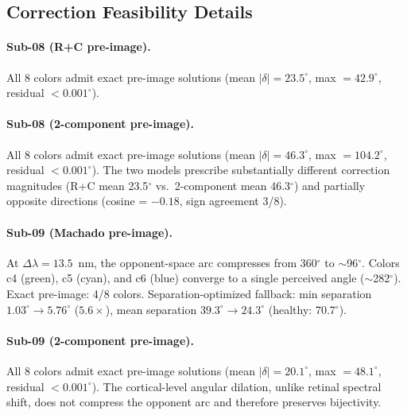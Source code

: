 \documentclass{article}
\begin{document}
\subsection{Correction Feasibility Details}

\paragraph{Sub-08 (R+C pre-image).}
All 8 colors admit exact pre-image solutions (mean $|\delta| = 23.5^\circ$, max $= 42.9^\circ$, residual $< 0.001^\circ$).

\paragraph{Sub-08 (2-component pre-image).}
All 8 colors admit exact pre-image solutions (mean $|\delta| = 46.3^\circ$, max $= 104.2^\circ$, residual $< 0.001^\circ$).
The two models prescribe substantially different correction magnitudes (R+C mean 23.5$^\circ$ vs.\ 2-component mean 46.3$^\circ$) and partially opposite directions (cosine = $-0.18$, sign agreement 3/8).

\paragraph{Sub-09 (Machado pre-image).}
At $\Delta\lambda = 13.5$~nm, the opponent-space arc compresses from 360$^\circ$ to $\sim$96$^\circ$.
Colors c4 (green), c5 (cyan), and c6 (blue) converge to a single perceived angle ($\sim$282$^\circ$).
Exact pre-image: 4/8 colors.
Separation-optimized fallback: min separation $1.03^\circ \to 5.76^\circ$ ($5.6\times$), mean separation $39.3^\circ \to 24.3^\circ$ (healthy: 70.7$^\circ$).

\paragraph{Sub-09 (2-component pre-image).}
All 8 colors admit exact pre-image solutions (mean $|\delta| = 20.1^\circ$, max $= 48.1^\circ$, residual $< 0.001^\circ$).
The cortical-level angular dilation, unlike retinal spectral shift, does not compress the opponent arc and therefore preserves bijectivity.
\end{document}

